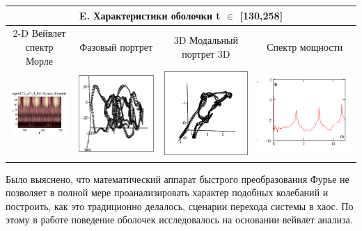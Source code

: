 \documentclass[12pt,letterpaper]{extreport}
\begin{document}
\begin{table}[H]
{\begin{tabular}{|c|c|c|c|}
\multicolumn{4}{|c|}{E. Характеристики оболочки  t $\in$ [130,258]}\\

\hline
\footnotesize 2-D Вейвлет спектр Морле&\footnotesize Фазовый 
портрет&\footnotesize 3D Модальный портрет 3D&\footnotesize Спектр мощности\\
\hline
	\includegraphics[scale=0.9]{e1} 	
	&	
	\includegraphics[scale=0.9]{e2} 	
	&	
	\includegraphics[scale=0.9]{e3} 
	&
	\includegraphics[scale=0.9]{e4} 
\\
\hline
\end{tabular}

}
\end{table}	
\par Было выяснено, что математический аппарат быстрого преобразования Фурье не
позволяет в полной мере проанализировать характер подобных колебаний и 
построить, как это традиционно делалось, сценарии перехода системы в хаос. По 
этому в работе поведение оболочек исследовалось на основании вейвлет анализа.
\end{document}

